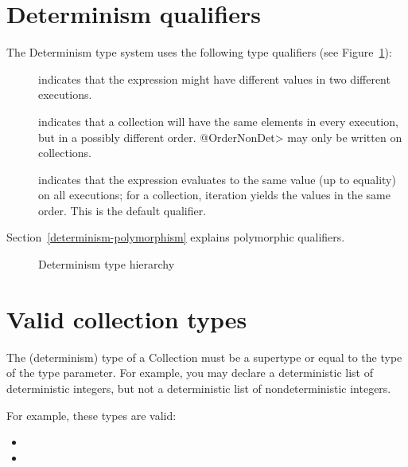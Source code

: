 \section{Determinism qualifiers\label{determinism-qualifiers}}

The Determinism type system uses the following type qualifiers (see Figure~\ref{fig-determinism-hierarchy}):
\begin{description}
\item[] indicates
  that the expression might have different values in two different executions.
\item[] indicates that
  a collection will have the same elements in every execution, but in a
  possibly different order.  \<@OrderNonDet> may only be written on
  collections.
\item[] indicates that
  the expression evaluates to the same value (up to equality) on all
  executions; for a collection, iteration yields the values in the same
  order.
  This is the default qualifier.
\end{description}

Section~\ref{determinism-polymorphism} explains polymorphic qualifiers.

\begin{figure}
  \begin{center}
  \end{center}
\caption{Determinism type hierarchy}
\label{fig-determinism-hierarchy}
\end{figure}


\section{Valid collection types\label{determinism-collection-types}}

The (determinism) type of a Collection must be a supertype or equal to
the type of the type parameter.  For example, you may declare a
deterministic list of deterministic integers, but not a deterministic
list of nondeterministic integers.

For example, these types are valid:
\begin{itemize}
    \item {}
    \item {}\code{>}
\end{itemize}

